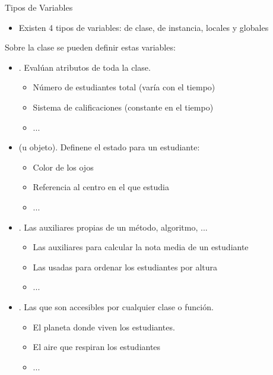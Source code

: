 \documentclass[10pt,envcountsect,spanish]{beamer}
\begin{document}
\begin{frame}[label={tiposVariables}]{Tipos de Variables}

\begin{itemize}
\item Existen 4 tipos de variables: de clase, de instancia, locales y globales
\end{itemize}

\unEjemplo Sobre la clase  se pueden definir estas variables:

\begin{itemize}
\item {}. Evalúan atributos de toda la clase.
	\begin{itemize}
	\item Número de estudiantes total (varía con el tiempo)
	\item Sistema de calificaciones (constante en el tiempo)
	\item ...	
	\end{itemize}
	
\item {} (u objeto).  Definene el estado para un estudiante:
	\begin{itemize}
	\item Color de los ojos
	\item Referencia al centro en el que estudia
	\item ...
	\end{itemize}
	
\item {}. Las auxiliares propias de un método, algoritmo, ...
	\begin{itemize}
	\item Las auxiliares para calcular la nota media de un estudiante
	\item Las usadas para ordenar los estudiantes por altura
	\item ...
	\end{itemize}
	
\item {}. Las que son accesibles por cualquier clase o función.
	\begin{itemize}
	\item El planeta donde viven los estudiantes.
	\item El aire que respiran los estudiantes
	\item ...
	\end{itemize}
\end{itemize}


\end{frame}
\end{document}
